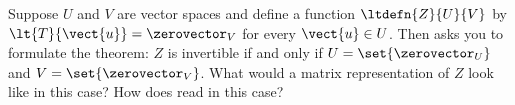 Suppose $U$ and $V$ are vector spaces and define a function $\ltdefn{Z}{U}{V}$ by $\lt{T}{\vect{u}}=\zerovector_{V}$ for every $\vect{u}\in U$.  Then  asks you to formulate the theorem:  $Z$ is invertible if and only if $U=\set{\zerovector_U}$ and $V=\set{\zerovector_V}$.  What would a matrix representation of $Z$ look like in this case?  How does  read in this case?